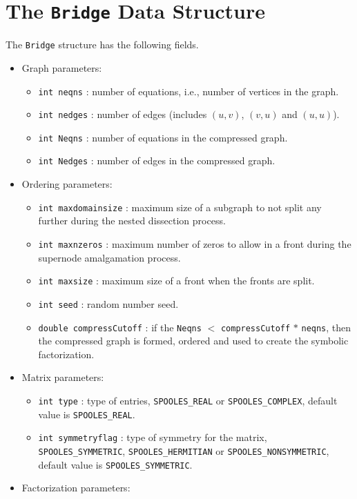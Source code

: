 \section{The \texttt{Bridge} Data Structure}
\label{section:Bridge:dataStructure}
\par
The {\tt Bridge} structure has the following fields.
\begin{itemize}
%
\item Graph parameters:
\begin{itemize} 
\item
{\tt int neqns} : number of equations, 
i.e., number of vertices in the graph.
\item
{\tt int nedges} : number of edges 
(includes $(u,v)$, $(v,u)$ and $(u,u)$).
\item
{\tt int Neqns} : number of equations in the compressed graph.
\item
{\tt int Nedges} : number of edges in the compressed graph.
\end{itemize}
%
\item Ordering parameters:
\begin{itemize}
\item
{\tt int maxdomainsize} : maximum size of a subgraph to not split any
further during the nested dissection process.
\item
{\tt int maxnzeros} : maximum number of zeros to allow in a front 
during the supernode amalgamation process.
\item
{\tt int maxsize} : maximum size of a front when the fronts are split.
\item
{\tt int seed} : random number seed.
\item
{\tt double compressCutoff} : if the \texttt{Neqns} $<$
\texttt{compressCutoff} $*$ \texttt{neqns}, then the compressed
graph is formed, ordered and used to create the symbolic
factorization.
\end{itemize}
%
\item Matrix parameters:
\begin{itemize}
\item
{\tt int type} : type of entries,
{\tt SPOOLES\_REAL} or {\tt SPOOLES\_COMPLEX},
default value is {\tt SPOOLES\_REAL}.
\item
{\tt int symmetryflag} : type of symmetry for the matrix,
{\tt SPOOLES\_SYMMETRIC}, {\tt SPOOLES\_HERMITIAN}
or {\tt SPOOLES\_NONSYMMETRIC},
default value is {\tt SPOOLES\_SYMMETRIC}.
\end{itemize}
%
\item Factorization parameters:

\end{itemize}
